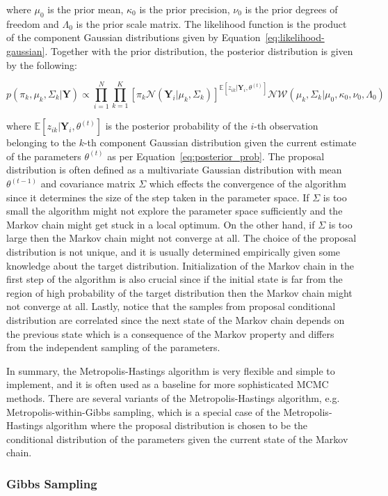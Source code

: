 where $\mu_0$ is the prior mean, $\kappa_0$ is the prior precision, $\nu_0$ is the prior degrees of freedom and $\Lambda_0$ is the prior scale matrix.
The likelihood function is the product of the component Gaussian distributions given by Equation~\ref{eq:likelihood-gaussian}. Together with the prior distribution, the posterior distribution is given by the following:

\begin{equation}
    p(\pi_k,\mu_k,\Sigma_k|\textbf{Y}) \propto \prod_{i=1}^{N} \prod_{k=1}^{K} {\left[ \pi_k \mathcal{N}(\textbf{Y}_i|\mu_k,\Sigma_k) \right]}^{\mathbb{E}[z_{ik}|\textbf{Y}_i,\theta^{(t)}]} \mathcal{NW}(\mu_k,\Sigma_k|\mu_0,\kappa_0,\nu_0,\Lambda_0)
\end{equation}

where $\mathbb{E}[z_{ik}|\textbf{Y}_i,\theta^{(t)}]$ is the posterior probability of the $i$-th observation belonging to the $k$-th component Gaussian distribution given the current estimate of the parameters $\theta^{(t)}$ as per Equation~\ref{eq:posterior_prob}.
The proposal distribution is often defined as a multivariate Gaussian distribution with mean $\theta^{(t-1)}$ and covariance matrix $\Sigma$ which effects the convergence of the algorithm since it determines the size of the step taken in the parameter space. 
If $\Sigma$ is too small the algorithm might not explore the parameter space sufficiently and the Markov chain might get stuck in a local optimum. On the other hand, if $\Sigma$ is too large then the Markov chain might not converge at all. 
The choice of the proposal distribution is not unique, and it is usually determined empirically given some knowledge about the target distribution. 
Initialization of the Markov chain in the first step of the algorithm is also crucial since if the initial state is far from the region of high probability of the target distribution then the Markov chain might not converge at all.
Lastly, notice that the samples from proposal conditional distribution are correlated since the next state of the Markov chain depends on the previous state which is a consequence of the Markov property and differs from the independent sampling of the parameters.

In summary, the Metropolis-Hastings algorithm is very flexible and simple to implement, and it is often used as a baseline for more sophisticated MCMC methods. 
There are several variants of the Metropolis-Hastings algorithm, e.g. Metropolis-within-Gibbs sampling, which is a special case of the Metropolis-Hastings algorithm where the proposal distribution is chosen to be the conditional distribution of the parameters given the current state of the Markov chain.


\subsubsection{Gibbs Sampling}

